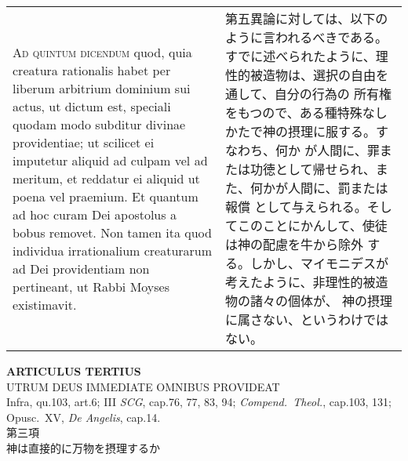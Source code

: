 \documentclass[10pt]{jsarticle} %
\begin{document}
\begin{longtable}{p{21em}p{21em}}
\\



{\scshape Ad quintum dicendum} quod, quia creatura
rationalis habet per liberum arbitrium dominium sui actus, ut dictum
est, speciali quodam modo subditur divinae providentiae; ut scilicet ei
imputetur aliquid ad culpam vel ad meritum, et reddatur ei aliquid ut
poena vel praemium. Et quantum ad hoc curam Dei apostolus a bobus
removet. Non tamen ita quod individua irrationalium creaturarum ad Dei
providentiam non pertineant, ut Rabbi Moyses existimavit.

&

第五異論に対しては、以下のように言われるべきである。
すでに述べられたように、理性的被造物は、選択の自由を通して、自分の行為の
 所有権をもつので、ある種特殊なしかたで神の摂理に服する。すなわち、何か
 が人間に、罪または功徳として帰せられ、また、何かが人間に、罰または報償
 として与えられる。そしてこのことにかんして、使徒は神の配慮を牛から除外
 する。しかし、マイモニデスが考えたように、非理性的被造物の諸々の個体が、
 神の摂理に属さない、というわけではない。



\end{longtable}
\newpage



\begin{center}
 {\Large {\bf ARTICULUS TERTIUS}}\\
 {\large UTRUM DEUS IMMEDIATE OMNIBUS PROVIDEAT}\\
 {\footnotesize Infra, qu.103, art.6; III {\itshape SCG}, cap.76, 77,
 83, 94; {\itshape Compend.~Theol.}, cap.103, 131; Opusc.~XV, {\itshape
 De Angelis}, cap.14.}\\
 {\Large 第三項\\神は直接的に万物を摂理するか}
\end{center}
\end{document}
